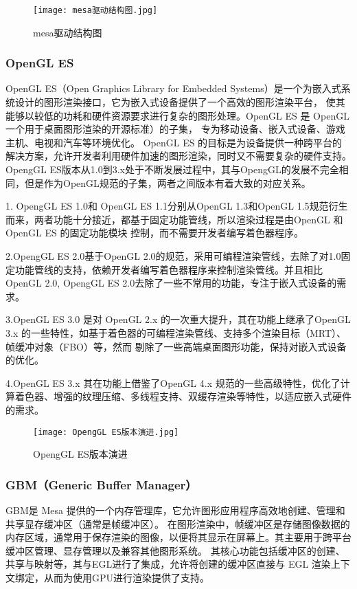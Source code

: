 \begin{figure}[h]
  \centering
  \texttt{[image: mesa驱动结构图.jpg]}
  \caption{mesa驱动结构图}
  \label{fig:mesa驱动结构图}
\end{figure}

\subsubsection{OpenGL ES}
OpenGL ES（Open Graphics Library for Embedded Systems）是一个为嵌入式系统设计的图形渲染接口，它为嵌入式设备提供了一个高效的图形渲染平台，
使其能够以较低的功耗和硬件资源要求进行复杂的图形处理。OpenGL ES 是 OpenGL\cite{2005Interpretive}一个用于桌面图形渲染的开源标准）的子集，
专为移动设备、嵌入式设备、游戏主机、电视和汽车等环境优化。
OpenGL ES 的目标是为设备提供一种跨平台的解决方案，允许开发者利用硬件加速的图形渲染，同时又不需要复杂的硬件支持。
OpengGL ES版本从1.0到3.x处于不断发展过程中，其与OpengGL的发展不完全相同，但是作为OpenGL规范的子集，两者之间版本有着大致的对应关系。

1. OpengGL ES 1.0和 OpenGL ES 1.1分别从OpenGL 1.3和OpenGL 1.5规范衍生而来，两者功能十分接近，都基于固定功能管线，所以渲染过程是由OpenGL 和 OpenGL ES 的固定功能模块
控制，而不需要开发者编写着色器程序。

2.OpengGL ES 2.0基于OpenGL 2.0的规范，采用可编程渲染管线，去除了对1.0固定功能管线的支持，依赖开发者编写着色器程序来控制渲染管线。并且相比OpenGL 2.0,
OpengGL ES 2.0去除了一些不常用的功能，专注于嵌入式设备的需求。

3.OpenGL ES 3.0 是对 OpenGL 2.x 的一次重大提升，其在功能上继承了OpenGL 3.x 的一些特性，如基于着色器的可编程渲染管线、支持多个渲染目标（MRT）、帧缓冲对象（FBO）等，然而
剔除了一些高端桌面图形功能，保持对嵌入式设备的优化。

4.OpenGL ES 3.x 其在功能上借鉴了OpenGL 4.x 规范的一些高级特性，优化了计算着色器、增强的纹理压缩、多线程支持、双缓存渲染等特性，以适应嵌入式硬件的需求。

\begin{figure}[h]
  \centering
  \texttt{[image: OpengGL ES版本演进.jpg]}
  \caption{OpengGL ES版本演进}
  \label{fig:OpengGL ES版本演进}
\end{figure}

\subsubsection{GBM（Generic Buffer Manager）}
GBM是 Mesa 提供的一个内存管理库，它允许图形应用程序高效地创建、管理和共享显存缓冲区（通常是帧缓冲区）。
在图形渲染中，帧缓冲区是存储图像数据的内存区域，通常用于保存渲染的图像，以便将其显示在屏幕上。其主要用于跨平台缓冲区管理、显存管理以及兼容其他图形系统。
其核心功能包括缓冲区的创建、共享与映射等，其与EGL进行了集成，允许将创建的缓冲区直接与 EGL 渲染上下文绑定，从而为使用GPU进行渲染提供了支持。

